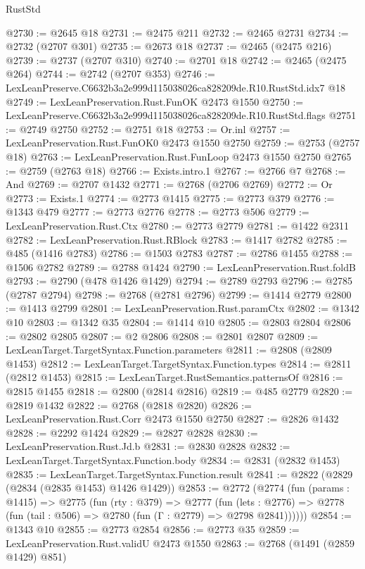 \begin{lexlean}{RustStd}
\begin{coremodule}
@2730 := @2645 @18
@2731 := @2475 @211
@2732 := @2465 @2731
@2734 := @2732 (@2707 @301)
@2735 := @2673 @18
@2737 := @2465 (@2475 @216)
@2739 := @2737 (@2707 @310)
@2740 := @2701 @18
@2742 := @2465 (@2475 @264)
@2744 := @2742 (@2707 @353)
@2746 := LexLeanPreserve.C6632b3a2e999d115038026ca828209de.R10.RustStd.idx7 @18
@2749 := LexLeanPreservation.Rust.FunOK @2473 @1550
@2750 := LexLeanPreserve.C6632b3a2e999d115038026ca828209de.R10.RustStd.flags
@2751 := @2749 @2750
@2752 := @2751 @18
@2753 := Or.inl
@2757 := LexLeanPreservation.Rust.FunOK0 @2473 @1550 @2750
@2759 := @2753 (@2757 @18)
@2763 := LexLeanPreservation.Rust.FunLoop @2473 @1550 @2750
@2765 := @2759 (@2763 @18)
@2766 := Exists.intro.{1}
@2767 := @2766 @7
@2768 := And
@2769 := @2707 @1432
@2771 := @2768 (@2706 @2769)
@2772 := Or
@2773 := Exists.{1}
@2774 := @2773 @1415
@2775 := @2773 @379
@2776 := @1343 @479
@2777 := @2773 @2776
@2778 := @2773 @506
@2779 := LexLeanPreservation.Rust.Ctx
@2780 := @2773 @2779
@2781 := @1422 @2311
@2782 := LexLeanPreservation.Rust.RBlock
@2783 := @1417 @2782
@2785 := @485 (@1416 @2783)
@2786 := @1503 @2783
@2787 := @2786 @1455
@2788 := @1506 @2782
@2789 := @2788 @1424
@2790 := LexLeanPreservation.Rust.foldB
@2793 := @2790 (@478 @1426 @1429)
@2794 := @2789 @2793
@2796 := @2785 (@2787 @2794)
@2798 := @2768 (@2781 @2796)
@2799 := @1414 @2779
@2800 := @1413 @2799
@2801 := LexLeanPreservation.Rust.paramCtx
@2802 := @1342 @10
@2803 := @1342 @35
@2804 := @1414 @10
@2805 := @2803 @2804
@2806 := @2802 @2805
@2807 := @2 @2806
@2808 := @2801 @2807
@2809 := LexLeanTarget.TargetSyntax.Function.parameters
@2811 := @2808 (@2809 @1453)
@2812 := LexLeanTarget.TargetSyntax.Function.types
@2814 := @2811 (@2812 @1453)
@2815 := LexLeanTarget.RustSemantics.patternsOf
@2816 := @2815 @1455
@2818 := @2800 (@2814 @2816)
@2819 := @485 @2779
@2820 := @2819 @1432
@2822 := @2768 (@2818 @2820)
@2826 := LexLeanPreservation.Rust.Corr @2473 @1550 @2750
@2827 := @2826 @1432
@2828 := @2292 @1424
@2829 := @2827 @2828
@2830 := LexLeanPreservation.Rust.Jd.b
@2831 := @2830 @2828
@2832 := LexLeanTarget.TargetSyntax.Function.body
@2834 := @2831 (@2832 @1453)
@2835 := LexLeanTarget.TargetSyntax.Function.result
@2841 := @2822 (@2829 (@2834 (@2835 @1453) @1426 @1429))
@2853 := @2772
    (@2774
      (fun (params : @1415) =>
      @2775
        (fun (rty : @379) =>
        @2777
          (fun (lets : @2776) =>
          @2778 (fun (tail : @506) => @2780 (fun (Γ : @2779) => @2798 @2841))))))
@2854 := @1343 @10
@2855 := @2773 @2854
@2856 := @2773 @35
@2859 := LexLeanPreservation.Rust.validU @2473 @1550
@2863 := @2768 (@1491 (@2859 @1429) @851)

\end{coremodule}
\end{lexlean}
